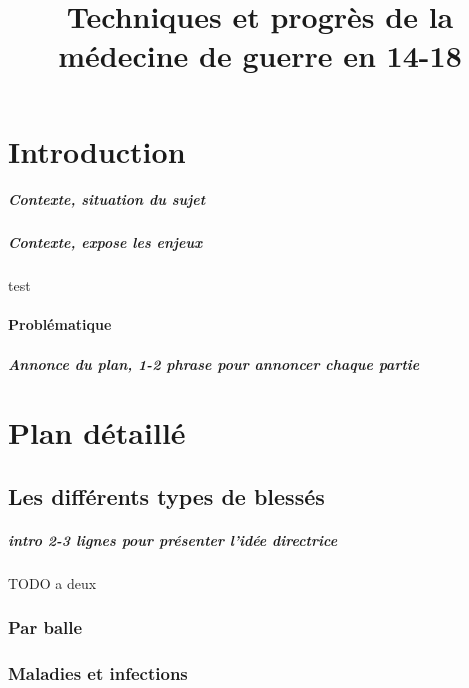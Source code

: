 \documentclass[a4paper, BCOR=0mm, fontsize=12pt, titlepage=firstiscover]{scrreprt}
\title{Techniques et progrès de la médecine de guerre en 14-18}
\date{}
\begin{document}
	
	
	\maketitle
	
	\tableofcontents
	
	
	
	\chapter{Introduction}
	\paragraph{Contexte, situation du sujet}
	\paragraph{Contexte, expose les enjeux} test\\\\
	
	
	{\centering \large \textbf{Problématique}}
	\\
	\paragraph{Annonce du plan, 1-2 phrase pour annoncer chaque partie}
	
	
	\chapter{Plan détaillé}
	\section{Les différents types de blessés}
	\paragraph{intro 2-3 lignes pour présenter l'idée directrice}
		TODO a deux
		\subsection{Par balle}
		\subsection{Maladies et infections}
\end{document}
